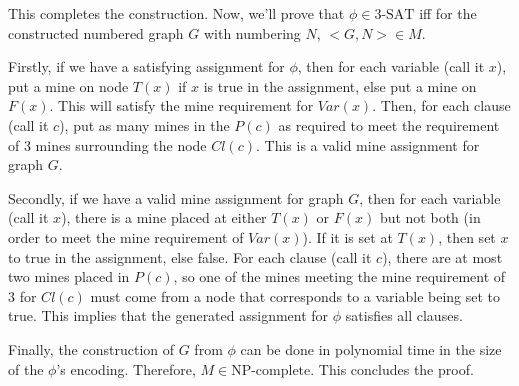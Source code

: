 \documentclass{article}
\begin{document}
This completes the construction. Now, we'll prove that $\phi \in \text{3-SAT}$ iff for the constructed numbered graph $G$ with numbering $N$, $<G, N> \in M$.

Firstly, if we have a satisfying assignment for $\phi$, then for each variable (call it $x$), put a mine on node $T(x)$ if $x$ is true in the assignment, else put a mine on $F(x)$. This will satisfy the mine requirement for $Var(x)$. Then, for each clause (call it $c$), put as many mines in the $P(c)$ as required to meet the requirement of 3 mines surrounding the node $Cl(c)$. This is a valid mine assignment for graph $G$.

Secondly, if we have a valid mine assignment for graph $G$, then for each variable (call it $x$), there is a mine placed at either $T(x)$ or $F(x)$ but not both (in order to meet the mine requirement of $Var(x)$). If it is set at $T(x)$, then set $x$ to true in the assignment, else false. For each clause (call it $c$), there are at most two mines placed in $P(c)$, so one of the mines meeting the mine requirement of 3 for $Cl(c)$ must come from a node that corresponds to a variable being set to true. This implies that the generated assignment for $\phi$ satisfies all clauses.

Finally, the construction of $G$ from $\phi$ can be done in polynomial time in the size of the $\phi$'s encoding. Therefore, $M \in \text{NP-complete}$. This concludes the proof.
\end{document}
